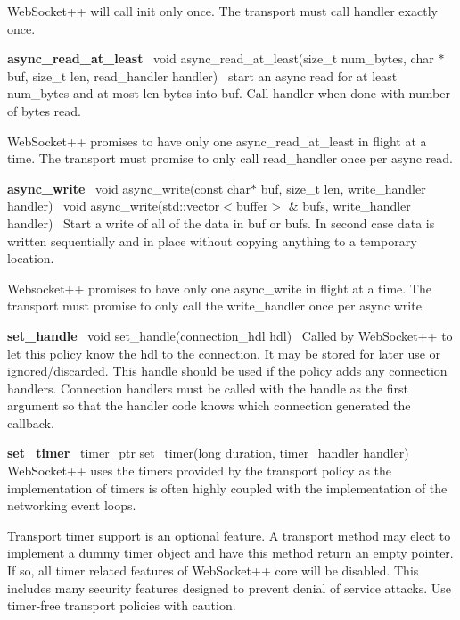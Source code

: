 Web\+Socket++ will call init only once. The transport must call {\ttfamily handler} exactly once.

{\bfseries async\+\_\+read\+\_\+at\+\_\+least}~\newline
{\ttfamily void async\+\_\+read\+\_\+at\+\_\+least(size\+\_\+t num\+\_\+bytes, char $\ast$buf, size\+\_\+t len, read\+\_\+handler handler)}~\newline
start an async read for at least num\+\_\+bytes and at most len bytes into buf. Call handler when done with number of bytes read.

Web\+Socket++ promises to have only one async\+\_\+read\+\_\+at\+\_\+least in flight at a time. The transport must promise to only call read\+\_\+handler once per async read.

{\bfseries async\+\_\+write}~\newline
{\ttfamily void async\+\_\+write(const char$\ast$ buf, size\+\_\+t len, write\+\_\+handler handler)}~\newline
{\ttfamily void async\+\_\+write(std\+::vector$<$buffer$>$ \& bufs, write\+\_\+handler handler)}~\newline
Start a write of all of the data in buf or bufs. In second case data is written sequentially and in place without copying anything to a temporary location.

Websocket++ promises to have only one async\+\_\+write in flight at a time. The transport must promise to only call the write\+\_\+handler once per async write

{\bfseries set\+\_\+handle}~\newline
{\ttfamily void set\+\_\+handle(connection\+\_\+hdl hdl)}~\newline
Called by Web\+Socket++ to let this policy know the hdl to the connection. It may be stored for later use or ignored/discarded. This handle should be used if the policy adds any connection handlers. Connection handlers must be called with the handle as the first argument so that the handler code knows which connection generated the callback.

{\bfseries set\+\_\+timer}~\newline
{\ttfamily timer\+\_\+ptr set\+\_\+timer(long duration, timer\+\_\+handler handler)}~\newline
Web\+Socket++ uses the timers provided by the transport policy as the implementation of timers is often highly coupled with the implementation of the networking event loops.

Transport timer support is an optional feature. A transport method may elect to implement a dummy timer object and have this method return an empty pointer. If so, all timer related features of Web\+Socket++ core will be disabled. This includes many security features designed to prevent denial of service attacks. Use timer-\/free transport policies with caution.


